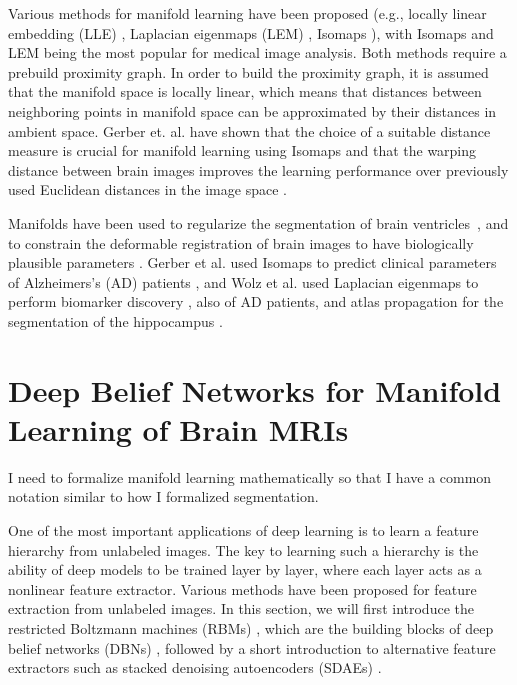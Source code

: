 Various methods for manifold learning have been proposed (e.g., locally linear
embedding (LLE) \citep{saul2003}, Laplacian eigenmaps (LEM) \citep{belkin2002},
Isomaps \citep{tenenbaum2000}), with Isomaps and LEM being the most popular for
medical image analysis. Both methods require a prebuild proximity graph. In
order to build the proximity graph, it is assumed that the manifold space is
locally linear, which means that distances between neighboring points in
manifold space can be approximated by their distances in ambient space. Gerber
et. al. have shown that the choice of a suitable distance measure is crucial for
manifold learning using Isomaps and that the warping distance between brain
images improves the learning performance over previously used Euclidean
distances in the image space \citep{gerber2010}.

Manifolds have been used to regularize the segmentation of brain
ventricles~\citep{etyngier2007}, and to constrain the deformable registration of
brain images to have biologically plausible parameters \citep{hamm2010}. Gerber
et al. used Isomaps to predict clinical parameters of Alzheimers's (AD) patients
\citep{gerber2010}, and Wolz et al. used Laplacian eigenmaps to perform
biomarker discovery \citep{wolz2011}, also of AD patients, and atlas propagation
for the segmentation of the hippocampus \citep{wolz2010}.

\section{Deep Belief Networks for Manifold Learning of Brain MRIs}

I need to formalize manifold learning mathematically so that I have a common
notation similar to how I formalized segmentation.

One of the most important applications of deep learning is to learn a feature
hierarchy from unlabeled images. The key to learning such a hierarchy is the
ability of deep models to be trained layer by layer, where each layer acts as a
nonlinear feature extractor. Various methods have been proposed for feature
extraction from unlabeled images. In this section, we will first introduce the
restricted Boltzmann machines (RBMs) \citep{freund1992,hinton2010}, which are the
building blocks of deep belief networks (DBNs) \citep{Hinton2006b}, followed by
a short introduction to alternative feature extractors such as stacked denoising
autoencoders (SDAEs) \citep{vincent2010}.


